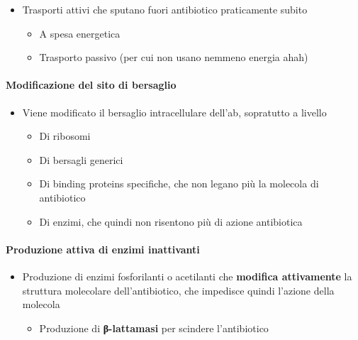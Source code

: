 \documentclass[italian,]{article}
\providecommand{\tightlist}{%
  \setlength{\itemsep}{0pt}\setlength{\parskip}{0pt}}
\newcommand{\marginnote}[1]{\marginpar{\footnotesize← \emph{#1}}}
\begin{document}
\begin{itemize}
\tightlist
\item
  Trasporti attivi che sputano fuori antibiotico praticamente subito

  \begin{itemize}
  \tightlist
  \item
    A spesa energetica
  \item
    Trasporto passivo (per cui non usano nemmeno energia ahah)
  \end{itemize}
\end{itemize}

\hypertarget{modificazione-del-sito-di-bersaglio}{%
\paragraph{Modificazione del sito di
bersaglio}\label{modificazione-del-sito-di-bersaglio}}

\begin{itemize}
\tightlist
\item
  Viene modificato il bersaglio intracellulare dell'ab, sopratutto a
  livello

  \begin{itemize}
  \tightlist
  \item
    Di ribosomi
  \item
    Di bersagli generici \marginnote{vedi \texttt{vancomicina}}
  \item
    Di binding proteins specifiche, che non legano più la molecola di
    antibiotico
  \item
    Di enzimi, che quindi non risentono più di azione antibiotica
  \end{itemize}
\end{itemize}

\hypertarget{produzione-attiva-di-enzimi-inattivanti}{%
\paragraph{Produzione attiva di enzimi
inattivanti}\label{produzione-attiva-di-enzimi-inattivanti}}

\begin{itemize}
\tightlist
\item
  Produzione di enzimi fosforilanti o acetilanti che \textbf{modifica
  attivamente} la struttura molecolare dell'antibiotico, che impedisce
  quindi l'azione della molecola

  \begin{itemize}
  \tightlist
  \item
    Produzione di \textbf{β-lattamasi} per scindere l'antibiotico
  \end{itemize}
\end{itemize}
\end{document}
